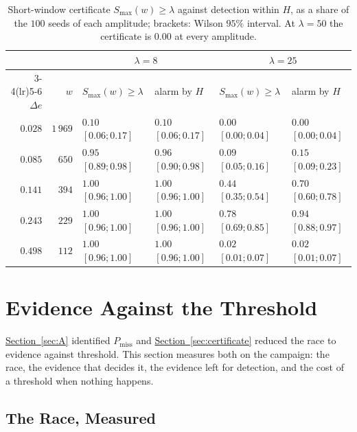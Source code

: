 \documentclass[10pt,conference]{IEEEtran}
\theoremstyle{definition}
\begin{document}
\begin{table}[t]
\centering
\caption{Short-window certificate $S_{\max}(w) \ge \lambda$ against detection within $H$,
as a share of the $100$ seeds of each amplitude; brackets: Wilson $95\%$ interval. At
$\lambda = 50$ the certificate is $0.00$ at every amplitude.}
\label{tab:certificate}
\begin{tabular}{rrllll}
\toprule
& & \multicolumn{2}{c}{$\lambda = 8$} & \multicolumn{2}{c}{$\lambda = 25$} \\
\cmidrule(lr){3-4}\cmidrule(lr){5-6}
$\Delta e$ & $w$ & $S_{\max}(w) \ge \lambda$ & alarm by $H$ & $S_{\max}(w) \ge \lambda$ & alarm by $H$ \\
\midrule
$0.028$ & $1\,969$ & $0.10$ $[0.06;0.17]$ & $0.10$ $[0.06;0.17]$ & $0.00$ $[0.00;0.04]$ & $0.00$ $[0.00;0.04]$ \\
$0.085$ & $650$    & $0.95$ $[0.89;0.98]$ & $0.96$ $[0.90;0.98]$ & $0.09$ $[0.05;0.16]$ & $0.15$ $[0.09;0.23]$ \\
$0.141$ & $394$    & $1.00$ $[0.96;1.00]$ & $1.00$ $[0.96;1.00]$ & $0.44$ $[0.35;0.54]$ & $0.70$ $[0.60;0.78]$ \\
$0.243$ & $229$    & $1.00$ $[0.96;1.00]$ & $1.00$ $[0.96;1.00]$ & $0.78$ $[0.69;0.85]$ & $0.94$ $[0.88;0.97]$ \\
$0.498$ & $112$    & $1.00$ $[0.96;1.00]$ & $1.00$ $[0.96;1.00]$ & $0.02$ $[0.01;0.07]$ & $0.02$ $[0.01;0.07]$ \\
\bottomrule
\end{tabular}
\end{table}

\section{Evidence Against the Threshold}
\label{sec:E}

\hyperref[sec:A]{Section~\ref*{sec:A}} identified $P_{\mathrm{miss}}$ and \hyperref[sec:certificate]{Section~\ref*{sec:certificate}}
reduced the race to evidence against threshold. This section measures both on the
campaign: the race, the evidence that decides it, the evidence left for detection, and the
cost of a threshold when nothing happens.

\subsection{The Race, Measured}
\end{document}

